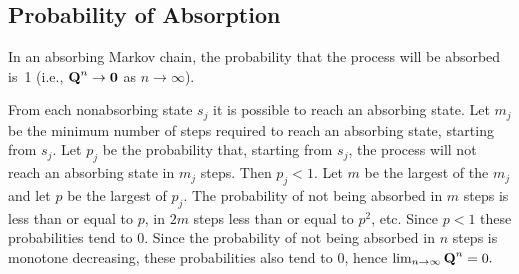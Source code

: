 \subsection*{Probability of Absorption}
\begin{theorem}\label{thm 11.2.1}
In an absorbing Markov chain, the probability that the process will be absorbed
is~1 (i.e., ${\mbox{\bf Q}\/}^n \to {\mbox{\bf0}\/}$ as $n \to \infty$).

\proof
From each nonabsorbing state $s_j$ it is possible to reach an absorbing state.  
Let $m_j$  be the minimum number of steps required to reach an absorbing state, 
starting from $s_j$.   Let $p_j$ be the probability that, starting from $s_j$, 
the process will not reach  an absorbing state in $m_j$ steps.  
Then $p_j <1$.  Let $m$ be the largest of the $m_j$ and let $p$ be the largest 
of $p_j$.  The probability of not  being absorbed in $m$ steps is less than or
equal to $p$, 
in $2m$ steps less than or equal to $p^2$, etc. Since $p<1$  these
probabilities tend to 0.  
Since the probability of not being absorbed in $n$ steps is monotone
decreasing, these
probabilities also tend to 0, hence $\lim_{n \rightarrow \infty } {\mbox{\bf Q}\/}^n =
0.$
\end{theorem}

